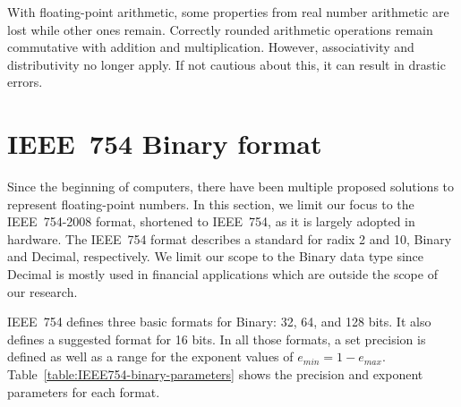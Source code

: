 With floating-point arithmetic, some properties from real number arithmetic are lost while other ones remain.
Correctly rounded arithmetic operations remain commutative with addition and multiplication.
However, associativity and distributivity no longer apply.
If not cautious about this, it can result in drastic errors. 

				
				
\section{IEEE~754 Binary format}
\label{sc:ieee754}
Since the beginning of computers, there have been multiple proposed solutions to represent floating-point numbers.
In this section, we limit our focus to the IEEE~754-2008 format, shortened to IEEE~754, as it is largely adopted in hardware.
The IEEE~754 format describes a standard for radix 2 and 10, Binary and Decimal, respectively.
We limit our scope to the Binary data type since Decimal is mostly used in financial applications which are outside the scope of our research.
				
IEEE~754 defines three basic formats for Binary: 32, 64, and 128 bits.
It also defines a suggested format for 16 bits.
In all those formats, a set precision is defined as well as a range for the exponent values of $e_{min} = 1 - e_{max}$.
Table~\ref{table:IEEE754-binary-parameters} shows the precision and exponent parameters for each format. 
				
